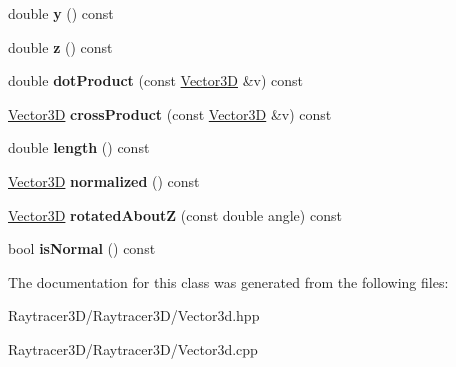 \begin{DoxyCompactItemize}
\hypertarget{class_vector3_d_a7146d35db2c1bf7606c8290282a423ec}{}\label{class_vector3_d_a7146d35db2c1bf7606c8290282a423ec} 
double {\bfseries y} () const
\item 
\hypertarget{class_vector3_d_af4ae427e82a23af845f804106daed509}{}\label{class_vector3_d_af4ae427e82a23af845f804106daed509} 
double {\bfseries z} () const
\item 
\hypertarget{class_vector3_d_af396bfa140d140d818a97100f7d6a532}{}\label{class_vector3_d_af396bfa140d140d818a97100f7d6a532} 
double {\bfseries dot\+Product} (const \hyperlink{class_vector3_d}{Vector3D} \&v) const
\item 
\hypertarget{class_vector3_d_a15b417a5abd07b8a7403bdb0ac5f95ec}{}\label{class_vector3_d_a15b417a5abd07b8a7403bdb0ac5f95ec} 
\hyperlink{class_vector3_d}{Vector3D} {\bfseries cross\+Product} (const \hyperlink{class_vector3_d}{Vector3D} \&v) const
\item 
\hypertarget{class_vector3_d_a4ddb90e85e10f0f32475725cb966a5ce}{}\label{class_vector3_d_a4ddb90e85e10f0f32475725cb966a5ce} 
double {\bfseries length} () const
\item 
\hypertarget{class_vector3_d_aac87aef508e65eb8ada23346b5e552c3}{}\label{class_vector3_d_aac87aef508e65eb8ada23346b5e552c3} 
\hyperlink{class_vector3_d}{Vector3D} {\bfseries normalized} () const
\item 
\hypertarget{class_vector3_d_a1698a0e33c975b78f0076b51331e6e94}{}\label{class_vector3_d_a1698a0e33c975b78f0076b51331e6e94} 
\hyperlink{class_vector3_d}{Vector3D} {\bfseries rotated\+AboutZ} (const double angle) const
\item 
\hypertarget{class_vector3_d_a5df051b736bdb50b63995442b0816938}{}\label{class_vector3_d_a5df051b736bdb50b63995442b0816938} 
bool {\bfseries is\+Normal} () const
\end{DoxyCompactItemize}


The documentation for this class was generated from the following files\+:\begin{DoxyCompactItemize}
\item 
Raytracer3\+D/\+Raytracer3\+D/Vector3d.\+hpp\item 
Raytracer3\+D/\+Raytracer3\+D/Vector3d.\+cpp\end{DoxyCompactItemize}
